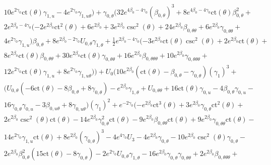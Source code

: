 \documentclass[a4paper,11pt]{article}
\numberwithin{equation}{section}
\begin{document}
\begin{align*}
&10 e^{2 \gamma_{0}} \text{ct}(\theta ) \gamma_{1,u}-4 e^{2 \gamma_{0}} \gamma_{1, u \theta})+\gamma_{0, \theta} (32 e^{4 \beta_{0}-4 \gamma_{0}} (\beta_{0, \theta})^3+8 e^{4 \beta_{0}-4 \gamma_{0}} \text{ct}(\theta ) \beta_{0, \theta}^2+\\
&2 e^{2 \beta_{0}-4 \gamma_{0}} (-2 e^{2 \beta_{0}} \text{ct}^2(\theta )+6 e^{2 \beta_{0}}+3 e^{2 \beta_{0}} \csc ^2(\theta )+24 e^{2 \beta_{0}} \beta_{0, \theta \theta}+6 e^{2 \beta_{0}} \gamma_{0, \theta \theta}+\\
&4 e^{2 \gamma_{0}} \gamma_{1,u}) \beta_{0, \theta}+8 e^{2 \beta_{0}-2 \gamma_{0}} U_{0, \theta} \gamma_{1, \theta}+\frac{1}{2} e^{2 \beta_{0}-4 \gamma_{0}} (-3 e^{2 \beta_{0}} \text{ct}(\theta ) \csc ^2(\theta )+2 e^{2 \beta_{0}} \text{ct}(\theta )+\\
&8 e^{2 \beta_{0}} \text{ct}(\theta ) \beta_{0, \theta \theta}+30 e^{2 \beta_{0}} \text{ct}(\theta ) \gamma_{0, \theta \theta}+16 e^{2 \beta_{0}} \beta_{0, \theta \theta \theta}+10 e^{2 \beta_{0}} \gamma_{0, \theta \theta \theta}+\\
&12 e^{2 \gamma_{0}} \text{ct}(\theta ) \gamma_{1,u}+8 e^{2 \gamma_{0}} \gamma_{1, u \theta}))+U_{0} (10 e^{2 \beta_{0}} (\text{ct}(\theta )-\beta_{0, \theta}-\gamma_{0, \theta}) (\gamma_{1})^3+\\
&(U_{0, \theta} (-6 \text{ct}(\theta )-8 \beta_{0, \theta}+8 \gamma_{0, \theta})-e^{2 \beta_{0}} \gamma_{1, \theta}+U_{0, \theta \theta}+16 \text{ct}(\theta ) \gamma_{0,u}-4 \beta_{0, \theta} \gamma_{0,u}-\\
&16 \gamma_{0, \theta} \gamma_{0,u}-3 \beta_{0, u \theta}+8 \gamma_{0, u \theta}) (\gamma_{1})^2+e^{-2 \gamma_{0}} (-e^{2 \beta_{0}} \text{ct}^3(\theta )+3 e^{2 \beta_{0}} \gamma_{0, \theta} \text{ct}^2(\theta )+\\
&2 e^{2 \beta_{0}} \csc ^2(\theta ) \text{ct}(\theta )-14 e^{2 \beta_{0}} \gamma_{0, \theta}^2 \text{ct}(\theta )-9 e^{2 \beta_{0}} \beta_{0, \theta \theta} \text{ct}(\theta )+9 e^{2 \beta_{0}} \gamma_{0, \theta \theta} \text{ct}(\theta )-\\
&14 e^{2 \gamma_{0}} \gamma_{1,u} \text{ct}(\theta )+8 e^{2 \beta_{0}} (\gamma_{0, \theta})^3-4 e^{4 \gamma_{0}} U_{3}-4 e^{2 \beta_{0}} \gamma_{0, \theta}-10 e^{2 \beta_{0}} \csc ^2(\theta ) \gamma_{0, \theta}-  \\
&2 e^{2 \beta_{0}} \beta_{0, \theta}^2 (15 \text{ct}(\theta )-8 \gamma_{0, \theta})-2 e^{2 \gamma_{0}} U_{0, \theta} \gamma_{1, \theta}-16 e^{2 \beta_{0}} \gamma_{0, \theta} \gamma_{0, \theta \theta}+2 e^{2 \beta_{0}} \beta_{0, \theta \theta \theta}+\\

\end{align*}
\end{document}
